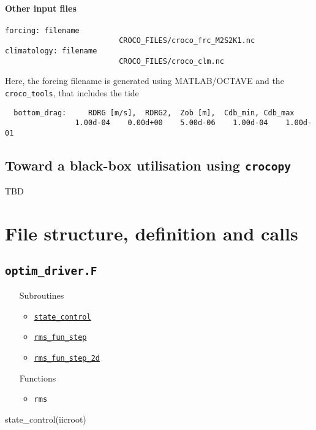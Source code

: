 \message{ !name(croco.tex)}\documentclass{article}
\begin{document}
\paragraph{Other input files}
\begin{lstlisting}
forcing: filename
                          CROCO_FILES/croco_frc_M2S2K1.nc
climatology: filename
                          CROCO_FILES/croco_clm.nc
\end{lstlisting}
Here, the forcing filename is generated using \textsc{MATLAB/OCTAVE} and the \texttt{croco\_tools}, that includes the tide                        


\begin{lstlisting}
  bottom_drag:     RDRG [m/s],  RDRG2,  Zob [m],  Cdb_min, Cdb_max
                1.00d-04    0.00d+00    5.00d-06    1.00d-04    1.00d-01
\end{lstlisting}

\subsection{Toward a black-box utilisation using \texttt{crocopy}}
TBD
\clearpage

\section{File structure, definition and calls}

\subsection{\texttt{optim\_driver.F}}
  \begin{itemize}
  \item[Subroutines]
    \begin{itemize}
    \item  \hyperref[statecontrol]{\texttt{state\_control}}
    \item \hyperref[rmsfunstep]{\texttt{rms\_fun\_step}}
    \item \hyperref[rmsfunstep2d]{\texttt{rms\_fun\_step\_2d}}
    \end{itemize}
  \item[Functions]
    \begin{itemize}
    \item \texttt{rms}
    \end{itemize}
  \end{itemize}

\begin{fortran}[label=statecontrol]
  state_control(iicroot)
\end{fortran}
\end{document}
